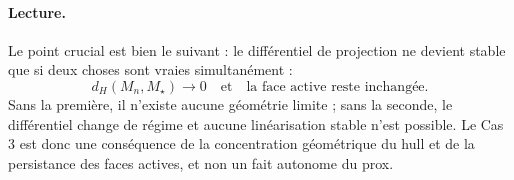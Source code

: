 \paragraph{Lecture.}
Le point crucial est bien le suivant : le différentiel de projection ne devient stable que si deux choses sont vraies simultanément :
\[
d_H(M_n,M_\star)\to 0
\quad\text{et}\quad
\text{la face active reste inchangée.}
\]
Sans la première, il n'existe aucune géométrie limite ; sans la seconde, le différentiel change de régime et aucune linéarisation stable n'est possible. Le Cas 3 est donc une conséquence de la concentration géométrique du hull et de la persistance des faces actives, et non un fait autonome du prox.




















































































